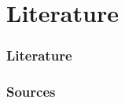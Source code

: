 \documentclass[compress]{beamer}
\begin{document}
\section*{Literature}

\begin{frame}[allowframebreaks]
	\frametitle{Literature}
    \frametitle{Sources}

	
	
\end{frame}
\end{document}
